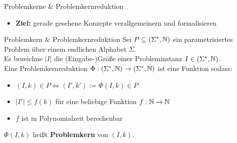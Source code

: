 \documentclass[navbaroff]{sdqbeamer}
\begin{document}
\begin{frame}[t]{Problemkerne \& Problemkernreduktion}
    \begin{itemize}
        \item \textbf{Ziel:} gerade gesehene Konzepte verallgemeinern und formalisieren
    \end{itemize}

    \begin{blueblock}{Problemkern \& Problemkernreduktion}
        Sei $ P \subseteq (\Sigma^*, \mathbb{N}) $ ein parametrisiertes Problem über einem endlichen Alphabet $\Sigma$.
        \\
        Es bezeichne $|I|$ die (Eingabe-)Größe einer Probleminstanz $I \in (\Sigma^*, \mathbb{N})$.
        \\
        Eine Problemkernreduktion $ \Phi: (\Sigma^*, \mathbb{N}) \rightarrow (\Sigma^*, \mathbb{N}) $ ist eine Funktion sodass:
        \begin{itemize}
            \item $(I, k) \in P \iff (I', k') := \Phi(I, k) \in P $
            \item $|I'| \leq f(k)$ für eine beliebige Funktion $f: \mathbb{N} \rightarrow \mathbb{N}$
            \item $f$ ist in Polynomialzeit berechenbar
        \end{itemize}
        \vspace{20pt}
        $ \Phi(I, k) $ heißt \textbf{Problemkern} von $(I, k)$.
    \end{blueblock}
\end{frame}
\end{document}
